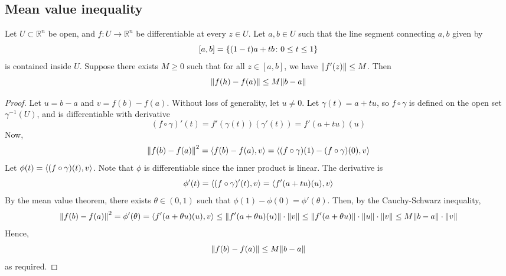 \subsection{Mean value inequality}
\begin{theorem}
	Let \( U \subset \mathbb R^n \) be open, and \( f \colon U \to \mathbb R^n \) be differentiable at every \( z \in U \).
	Let \( a, b \in U \) such that the line segment connecting \( a,b \) given by
	\[
		[a,b] = \qty{(1-t)a + tb \colon 0 \leq t \leq 1}
	\]
	is contained inside \( U \).
	Suppose there exists \( M \geq 0 \) such that for all \( z \in [a,b] \), we have \( \norm{f'(z)} \leq M \).
	Then
	\[
		\norm{f(h) - f(a)} \leq M \norm{b-a}
	\]
\end{theorem}
\begin{proof}
	Let \( u = b - a \) and \( v = f(b) - f(a) \).
	Without loss of generality, let \( u \neq 0 \).
	Let \( \gamma(t) = a + tu \), so \( f \circ \gamma \) is defined on the open set \( \gamma^{-1}(U) \), and is differentiable with derivative
	\[
		(f \circ \gamma)'(t) = f'(\gamma(t))(\gamma'(t)) = f'(a+tu)(u)
	\]
	Now,
	\[
		\norm{f(b) - f(a)}^2 = \left\langle{f(b) - f(a), v}\right\rangle = \left\langle{(f \circ \gamma)(1) - (f \circ \gamma)(0), v}\right\rangle
	\]
	Let \( \phi(t) = \left\langle{(f \circ \gamma)(t), v}\right\rangle \).
	Note that \( \phi \) is differentiable since the inner product is linear.
	The derivative is
	\[
		\phi'(t) = \left\langle{(f \circ \gamma)'(t), v}\right\rangle = \left\langle{f'(a+tu)(u), v}\right\rangle
	\]
	By the mean value theorem, there exists \( \theta \in (0,1) \) such that \( \phi(1) - \phi(0) = \phi'(\theta) \).
	Then, by the Cauchy-Schwarz inequality,
	\[
		\norm{f(b) - f(a)}^2 = \phi'(\theta) = \left\langle{f'(a+\theta u)(u), v}\right\rangle \leq \norm{f'(a+\theta u)(u)} \cdot \norm{v} \leq \norm{f'(a+\theta u)} \cdot \norm{u} \cdot \norm{v} \leq M \norm{b-a} \cdot \norm{v}
	\]
	Hence,
	\[
		\norm{f(b) - f(a)} \leq M \norm{b-a}
	\]
	as required.
\end{proof}
